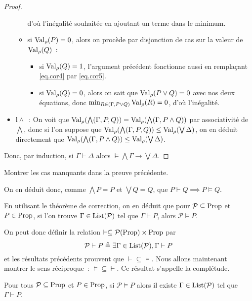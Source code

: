 \begin{proof}
\begin{itemize}
\begin{itemize}
      d'où l'inégalité souhaitée en ajoutant un terme dans le minimum.
    \item si $\operatorname{Val}_\rho(P) = 0$, alors on procède par disjonction de cas sur
      la valeur de $\operatorname{Val}_\rho(Q)$~:
      \begin{itemize}
      \item si $\operatorname{Val}_\rho(Q) = 1$, l'argument précédent fonctionne aussi en
        remplaçant \ref{eq.cor4} par \ref{eq.cor5}.
      \item si $\operatorname{Val}_\rho(Q) = 0$, alors on sait que $\operatorname{Val}_\rho(P\lor Q) = 0$
        avec nos deux équations, donc
        $\min_{R \in (\Gamma, P \lor Q)} \operatorname{Val}_\rho(R) = 0$, d'où l'inégalité.
      \end{itemize}
    \end{itemize}
  \item $\mathrm l\land$~: On voit que
    $\operatorname{Val}_\rho(\bigwedge(\Gamma,P,Q)) = \operatorname{Val}_\rho(\bigwedge(\Gamma, P \land Q))$
    par associativité de $\bigwedge$, donc si l'on suppose que
    $\operatorname{Val}_\rho(\bigwedge(\Gamma,P,Q)) \leq \operatorname{Val}_\rho(\bigvee\Delta)$, on en
    déduit directement que
    $\operatorname{Val}_\rho(\bigwedge(\Gamma,P\land Q)) \leq\operatorname{Val}_\rho(\bigvee\Delta)$.
  \end{itemize}
  Donc, par induction, si $\Gamma\vdash \Delta$ alors
  $\models \bigwedge\Gamma\to\bigvee\Delta$.
\end{proof}

\begin{exercise}
  Montrer les cas manquants dans la preuve précédente.
\end{exercise}

On en déduit donc, comme $\bigwedge P = P$ et $\bigvee Q = Q$, que
$P\vdash Q \implies P \vDash Q$.

\begin{remark}
  En utilisant le théorème de correction, on en déduit que pour
  $\mathcal P\subseteq \operatorname{Prop}$ et $P\in \operatorname{Prop}$, si l'on trouve
  $\Gamma\in\operatorname{List}(\mathcal P)$ tel que $\Gamma\vdash P$, alors
  $\mathcal P \vDash P$.

  On peut donc définir la relation
  $\vdash \subseteq \mathcal{P}(\operatorname{Prop})\times \operatorname{Prop}$ par
  \[\mathcal P\vdash P \triangleq \exists \Gamma\in\operatorname{List}(\mathcal P),
  \Gamma\vdash P\]
  et les résultats précédents prouvent que $\vdash\subseteq\vDash$. Nous allons
  maintenant montrer le sens réciproque~: $\vDash\subseteq\vdash$. Ce résultat
  s'appelle la complétude.
\end{remark}

\begin{theorem}
  Pour tous $\mathcal P\subseteq \operatorname{Prop}$ et $P\in \operatorname{Prop}$, si $\mathcal P\vDash P$
  alors il existe $\Gamma\in\operatorname{List}(\mathcal P)$ tel que $\Gamma\vdash P$.
\end{theorem}

